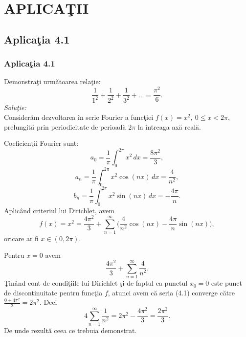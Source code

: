 \documentclass{beamer}
\begin{document}
\section{APLICA\c TII}
\subsection*{Aplica\c tia 4.1}
\begin{frame}

\frametitle{Aplica\c tia 4.1}
\hspace*{20pt}Demonstra\c ti urm\u atoarea rela\c tie:
\begin{equation*}
\frac{1}{1^2}+\frac{1}{2^2}+\frac{1}{3^2}+...=\frac{\pi^2}{6}.
\end{equation*}
\textit{Solu\c tie:}\\
\hspace*{20pt}Consider\u am dezvoltarea \^ in serie Fourier a func\c tiei $f(x)=x^2, \: 0 \leq x<2\pi$, prelungit\u a prin periodicitate de perioad\u a $2\pi$ la \^ intreaga ax\u a real\u a.\\
\end{frame}

\begin{frame}
\hspace*{20pt}Coeficien\c tii Fourier sunt:
\begin{equation*}
a_0=\frac{1}{\pi}\int_{0}^{2\pi} x^2\, dx = \frac{8\pi^2}{3},
\end{equation*}
\begin{equation*}
a_n=\frac{1}{\pi}\int_{0}^{2\pi} x^2 \cos(nx)\, dx=\frac{4}{n^2},
\end{equation*}
\begin{equation*}
b_n=\frac{1}{\pi}\int_{0}^{2\pi} x^2 \sin(nx)\, dx=-\frac{4\pi}{n}.
\end{equation*}
\hspace*{20pt}Aplic\^ and criteriul lui Dirichlet, avem
\begin{equation*}
f(x) = x^2 = \frac{4\pi^2}{3} + \sum_{n=1}^\infty\bigg( \frac{4}{n^2}\cos(nx)-\frac{4\pi}{n}\sin(nx)\bigg),
\end{equation*}
oricare ar fi $x \in (0, 2\pi)$.
\end{frame}

\begin{frame}
\hspace*{20pt}Pentru $x=0$ avem
\begin{equation*}
\frac{4\pi^2}{3} +  \sum_{n=1}^\infty \frac{4}{n^2}.
\end{equation*}
\hspace*{20pt}\c Tin\^ and cont de condi\c tiile lui Dirichlet \c si de faptul ca punctul $x_0=0$ este punct de discontinuitate pentru func\c tia $f$, atunci avem c\u a seria (4.1) converge c\u atre $\frac{0+4\pi^2}{2}=2\pi^2$. Deci
\begin{equation*}
4\sum_{n=1}^\infty \frac{1}{n^2}=2\pi^2-\frac{4\pi^2}{3}=\frac{2\pi^2}{3}.
\end{equation*}
\hspace*{20pt}De unde rezult\u a ceea ce trebuia demonstrat.
\end{frame}
\end{document}
